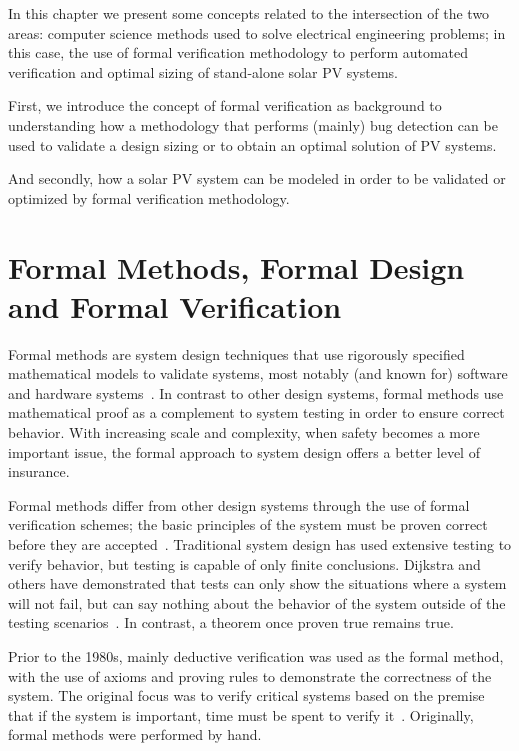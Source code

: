 In this chapter we present some concepts related to the intersection of the two areas:  computer science methods used to solve electrical engineering problems; in this case, the use of formal verification methodology to perform automated verification and optimal sizing of stand-alone solar PV systems.

First, we introduce the concept of formal verification as background to understanding how a methodology that performs (mainly) bug detection can be used to validate a design sizing or to obtain an optimal solution of PV systems.

And secondly, how a solar PV system can be modeled in order to be validated or optimized by formal verification methodology.

\section{Formal Methods, Formal Design and Formal Verification}

Formal methods are system design techniques that use rigorously specified mathematical models to validate systems, most notably (and known for) software and hardware systems~\cite{Collins98}. In contrast to other design systems, formal methods use mathematical proof as a complement to system testing in order to ensure correct behavior. With increasing scale and complexity, when safety becomes a more important issue, the formal approach to system design offers a better level of insurance.

Formal methods differ from other design systems through the use of formal verification schemes; the basic principles of the system must be proven correct before they are accepted~\cite{Bowen93}. Traditional system design has used extensive testing to verify behavior, but testing is capable of only finite conclusions. Dijkstra and others have demonstrated that tests can only show the situations where a system will not fail, but can say nothing about the behavior of the system outside of the testing scenarios~\cite{Bentley99}. In contrast, a theorem once proven true remains true.

Prior to the 1980s, mainly deductive verification was used as the formal method, with the use of axioms and proving rules to demonstrate the correctness of the system. The original focus was to verify critical systems based on the premise that if the system is important, time must be spent to verify it~\cite{Lowry1998}. Originally, formal methods were performed by hand.

